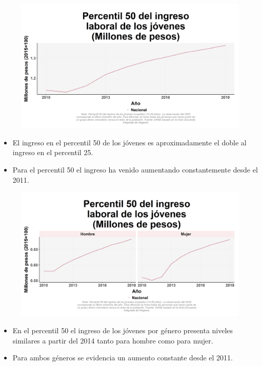     \begin{figure}[H]
        \caption[Percentil 50 del ingreso laboral de los jóvenes a nivel nacional ]{\label{inglab50jov_nal_trend} }
        \begin{center}
        \includegraphics[width=\textwidth,keepaspectratio]{img/var_23_trend.png}
        \end{center}
    \end{figure}
            \begin{itemize}
                \item El ingreso en el percentil 50 de los jóvenes es aproximadamente el doble al ingreso en el percentil 25.
                \item Para el percentil 50 el ingreso ha venido aumentando constantemente desde el 2011.
                \end{itemize}

    \begin{figure}[H]
        \caption[Percentil 50 del ingreso laboral de los jóvenes por género ]{\label{inglab50jov_gen_trend} }
        \begin{center}
        \includegraphics[width=\textwidth,keepaspectratio]{img/var_22_trend.png}
        \end{center}
    \end{figure}
            \begin{itemize}
                \item En el percentil 50 el ingreso de los jóvenes por género presenta niveles similares a partir del 2014 tanto para hombre como para mujer.
                \item Para ambos géneros se evidencia un aumento constante desde el 2011.
                \end{itemize}


